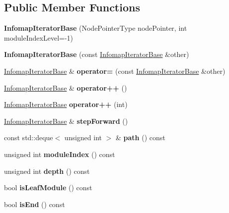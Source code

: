 \subsection*{Public Member Functions}
\begin{DoxyCompactItemize}
\item 
\mbox{\label{classInfomapIteratorBase_abceed51c040282c34fa947b1924f2e88}} 
{\bfseries Infomap\+Iterator\+Base} (Node\+Pointer\+Type node\+Pointer, int module\+Index\+Level=-\/1)
\item 
\mbox{\label{classInfomapIteratorBase_a3ea306dd2023becc75b6931ee2c40f11}} 
{\bfseries Infomap\+Iterator\+Base} (const \mbox{\hyperlink{classInfomapIteratorBase}{Infomap\+Iterator\+Base}} \&other)
\item 
\mbox{\label{classInfomapIteratorBase_a5f8309df81e66ce64b52d223000d74e3}} 
\mbox{\hyperlink{classInfomapIteratorBase}{Infomap\+Iterator\+Base}} \& {\bfseries operator=} (const \mbox{\hyperlink{classInfomapIteratorBase}{Infomap\+Iterator\+Base}} \&other)
\item 
\mbox{\label{classInfomapIteratorBase_a7039758df097f95ef6b6eaaa4caffaf3}} 
\mbox{\hyperlink{classInfomapIteratorBase}{Infomap\+Iterator\+Base}} \& {\bfseries operator++} ()
\item 
\mbox{\label{classInfomapIteratorBase_a3b59f8fa7573aed1f7ac1e52d05d1c91}} 
\mbox{\hyperlink{classInfomapIteratorBase}{Infomap\+Iterator\+Base}} {\bfseries operator++} (int)
\item 
\mbox{\label{classInfomapIteratorBase_a1c2d841b1d2dc478ecee58029168e263}} 
\mbox{\hyperlink{classInfomapIteratorBase}{Infomap\+Iterator\+Base}} \& {\bfseries step\+Forward} ()
\item 
\mbox{\label{classInfomapIteratorBase_a7bda60ec19cbe55e3b66e5ea6ab10622}} 
const std\+::deque$<$ unsigned int $>$ \& {\bfseries path} () const
\item 
\mbox{\label{classInfomapIteratorBase_a5f281f94d3bbcd0e37106d578b414110}} 
unsigned int {\bfseries module\+Index} () const
\item 
\mbox{\label{classInfomapIteratorBase_a69a02c6755cf0e381464bb5518f8a48f}} 
unsigned int {\bfseries depth} () const
\item 
\mbox{\label{classInfomapIteratorBase_aa936e11d262cdc9fbdea4dbe65c64667}} 
bool {\bfseries is\+Leaf\+Module} () const
\item 
\mbox{\label{classInfomapIteratorBase_ace4f9fa07bbc11bf39be5732176e9dd7}} 
bool {\bfseries is\+End} () const
\end{DoxyCompactItemize}
